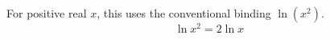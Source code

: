 \documentclass{article}
\begin{document}
For positive real $x$, this uses the conventional binding $\ln(x^2)$.
\begin{equation}
  \ln x^2 = 2\ln x
\end{equation}
\end{document}
